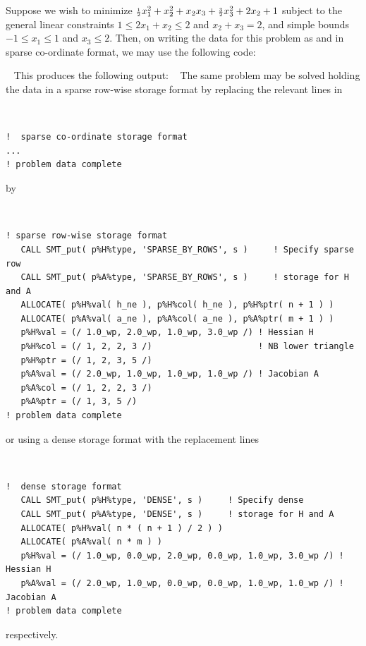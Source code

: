 \documentclass{galahad}
\begin{document}

\galexample
Suppose we wish to minimize
${\scriptstyle \frac{1}{2}} x_1^2 + x_2^2 + x_2 x_3 + {\scriptstyle \frac{3}{2}} x_3^2 + 2 x_2 + 1$
subject to the general linear constraints
$1 \leq  2 x_{1}  +  x_{2}  \leq  2$ and
$x_{2}  +  x_{3}  =  2$, and simple bounds
$-1  \leq  x_{1}  \leq  1$ and $x_{3}  \leq  2$.
Then, on writing the data for this problem as
and
in sparse co-ordinate format, we may use the following code:

{\tt \small
\VerbatimInput{\packageexample}
}
\noindent
This produces the following output:
{\tt \small
\VerbatimInput{\packageresults}
}
\noindent
The same problem may be solved holding the data in
a sparse row-wise storage format by replacing the relevant lines in
{\tt \small
\begin{verbatim}
!  sparse co-ordinate storage format
...
! problem data complete
\end{verbatim}
}
\noindent
by
{\tt \small
\begin{verbatim}
! sparse row-wise storage format
   CALL SMT_put( p%H%type, 'SPARSE_BY_ROWS', s )     ! Specify sparse row
   CALL SMT_put( p%A%type, 'SPARSE_BY_ROWS', s )     ! storage for H and A
   ALLOCATE( p%H%val( h_ne ), p%H%col( h_ne ), p%H%ptr( n + 1 ) )
   ALLOCATE( p%A%val( a_ne ), p%A%col( a_ne ), p%A%ptr( m + 1 ) )
   p%H%val = (/ 1.0_wp, 2.0_wp, 1.0_wp, 3.0_wp /) ! Hessian H
   p%H%col = (/ 1, 2, 2, 3 /)                     ! NB lower triangle
   p%H%ptr = (/ 1, 2, 3, 5 /)
   p%A%val = (/ 2.0_wp, 1.0_wp, 1.0_wp, 1.0_wp /) ! Jacobian A
   p%A%col = (/ 1, 2, 2, 3 /)
   p%A%ptr = (/ 1, 3, 5 /)
! problem data complete
\end{verbatim}
}
\noindent
or using a dense storage format with the replacement lines
{\tt \small
\begin{verbatim}
!  dense storage format
   CALL SMT_put( p%H%type, 'DENSE', s )     ! Specify dense
   CALL SMT_put( p%A%type, 'DENSE', s )     ! storage for H and A
   ALLOCATE( p%H%val( n * ( n + 1 ) / 2 ) )
   ALLOCATE( p%A%val( n * m ) )
   p%H%val = (/ 1.0_wp, 0.0_wp, 2.0_wp, 0.0_wp, 1.0_wp, 3.0_wp /) ! Hessian H
   p%A%val = (/ 2.0_wp, 1.0_wp, 0.0_wp, 0.0_wp, 1.0_wp, 1.0_wp /) ! Jacobian A
! problem data complete
\end{verbatim}
}
\noindent
respectively.
\end{document}
